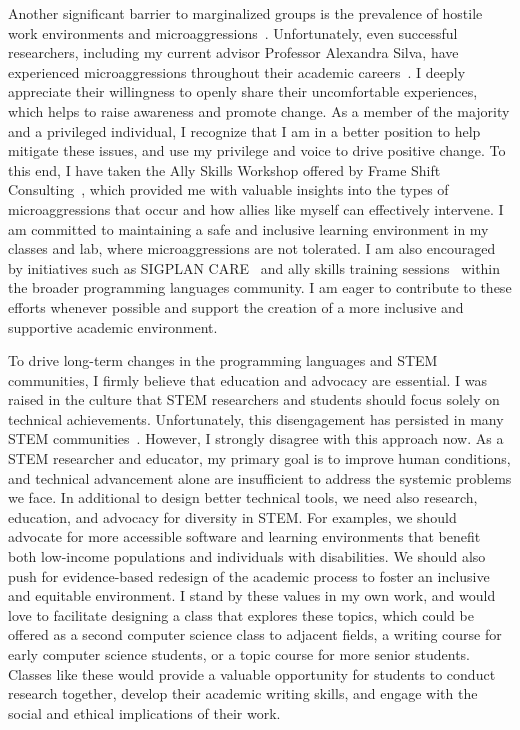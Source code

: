 \documentclass[11pt,a4paper,sans]{moderncv}
\begin{document}
Another significant barrier to marginalized groups is the prevalence of hostile work environments and microaggressions~\cite{kim_MicroaggressionsInterruptedExperience_2023,cohoon_SexismToxicWomens_2009,lee_IfYouArent_2020}. 
Unfortunately, even successful researchers, including my current advisor Professor Alexandra Silva, have experienced microaggressions throughout their academic careers~\cite{may26_PeoplePLAlexandra_2020,_AlexandraSilvaJoins_2021,zhang_MoralImplicationsBeing_2024}. 
I deeply appreciate their willingness to openly share their uncomfortable experiences, which helps to raise awareness and promote change.
As a member of the majority and a privileged individual, I recognize that I am in a better position to help mitigate these issues, and use my privilege and voice to drive positive change. 
To this end, I have taken the Ally Skills Workshop offered by Frame Shift Consulting~\cite{frameshiftconsulting_FocusAllySkills_2022}, which provided me with valuable insights into the types of microaggressions that occur and how allies like myself can effectively intervene. 
I am committed to maintaining a safe and inclusive learning environment in my classes and lab, where microaggressions are not tolerated. I am also encouraged by initiatives such as SIGPLAN CARE~\cite{_SIGPLANCARES_} and ally skills training sessions~\cite{_POPL2020Ally_} within the broader programming languages community. 
I am eager to contribute to these efforts whenever possible and support the creation of a more inclusive and supportive academic environment.

To drive long-term changes in the programming languages and STEM communities, I firmly believe that education and advocacy are essential. 
I was raised in the culture that STEM researchers and students should focus solely on technical achievements. 
Unfortunately, this disengagement has persisted in many STEM communities~\cite{cech_CultureDisengagementEngineering_2014a}. 
However, I strongly disagree with this approach now. 
As a STEM researcher and educator, my primary goal is to improve human conditions, and technical advancement alone are insufficient to address the systemic problems we face.
In additional to design better technical tools, we need also research, education, and advocacy for diversity in STEM. 
For examples, we should advocate for more accessible software and learning environments that benefit both low-income populations and individuals with disabilities. 
We should also push for evidence-based redesign of the academic process to foster an inclusive and equitable environment. 
I stand by these values in my own work, and would love to facilitate designing a class that explores these topics, which could be offered as a second computer science class to adjacent fields, a writing course for early computer science students, or a topic course for more senior students. 
Classes like these would provide a valuable opportunity for students to conduct research together, develop their academic writing skills, and engage with the social and ethical implications of their work.
\end{document}
